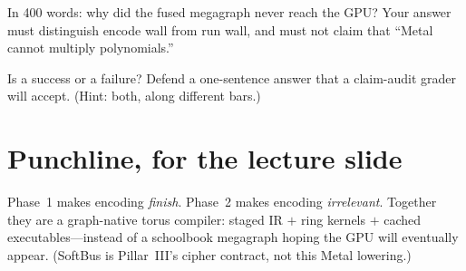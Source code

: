 \begin{exercise}
In 400 words: why did the fused megagraph never reach the GPU?
Your answer must distinguish encode wall from run wall, and must not claim
that ``Metal cannot multiply polynomials.''
\end{exercise}

\begin{exercise}
Is  a success or a failure?
Defend a one-sentence answer that a claim-audit grader will accept.
(Hint: both, along different bars.)
\end{exercise}

\section{Punchline, for the lecture slide}

Phase~1 makes encoding \emph{finish}.
Phase~2 makes encoding \emph{irrelevant}.
Together they are a graph-native torus compiler: staged IR $+$ ring kernels
$+$ cached executables---instead of a schoolbook megagraph hoping the GPU
will eventually appear.
(SoftBus is Pillar~III's cipher contract, not this Metal lowering.)

